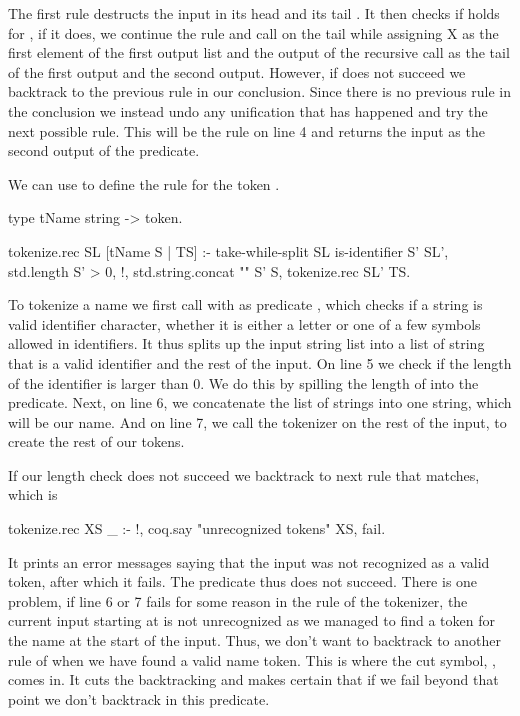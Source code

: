 \documentclass[thesis.tex]{subfiles}
\begin{document}
{{The first rule destructs the input in its head  and its tail . It then checks if  holds for , if it does, we continue the rule and call  on the tail while assigning X as the first element of the first output list and the output of the recursive call as the tail of the first output and the second output. However, if  does not succeed we backtrack to the previous rule in our conclusion. Since there is no previous rule in the conclusion we instead undo any unification that has happened and try the next possible rule. This will be the rule on line 4 and returns the input as the second output of the predicate.

We can use  to define the rule for the token .
\begin{elpicode}
  type tName string -> token.

  tokenize.rec SL [tName S | TS] :-
    take-while-split SL is-identifier S' SL',
    { std.length S' } > 0, !,
    std.string.concat "" S' S,
    tokenize.rec SL' TS.
\end{elpicode}
To tokenize a name we first call  with as predicate , which checks if a string is valid identifier character, whether it is either a letter or one of a few symbols allowed in identifiers. It thus splits up the input string list into a list of string that is a valid identifier and the rest of the input.
On line 5 we check if the length of the identifier is larger than 0. We do this by spilling the length of  into the \elpii{>} predicate.
Next, on line 6, we concatenate the list of strings into one string, which will be our name.
And on line 7, we call the tokenizer on the rest of the input, to create the rest of our tokens.

If our length check does not succeed we backtrack to next rule that matches, which is
\begin{elpicode}
  tokenize.rec XS _ :- !, 
    coq.say "unrecognized tokens" XS, fail.  
\end{elpicode}
It prints an error messages saying that the input was not recognized as a valid token, after which it fails. The predicate thus does not succeed. There is one problem, if line 6 or 7 fails for some reason in the  rule of the tokenizer, the current input starting at  is not unrecognized as we managed to find a token for the name at the start of the input. Thus, we don't want to backtrack to another rule of  when we have found a valid name token. This is where the cut symbol, \elpii{!}, comes in. It cuts the backtracking and makes certain that if we fail beyond that point we don't backtrack in this predicate.

}}
\end{document}
